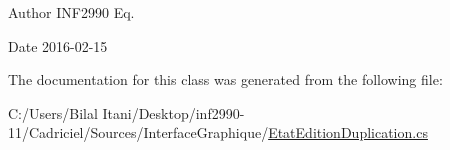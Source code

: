 \begin{DoxyAuthor}{Author}
I\+N\+F2990 Eq. 
\end{DoxyAuthor}
\begin{DoxyDate}{Date}
2016-\/02-\/15 
\end{DoxyDate}


The documentation for this class was generated from the following file\+:\begin{DoxyCompactItemize}
\item 
C\+:/\+Users/\+Bilal Itani/\+Desktop/inf2990-\/11/\+Cadriciel/\+Sources/\+Interface\+Graphique/\hyperlink{_etat_edition_duplication_8cs}{Etat\+Edition\+Duplication.\+cs}\end{DoxyCompactItemize}
